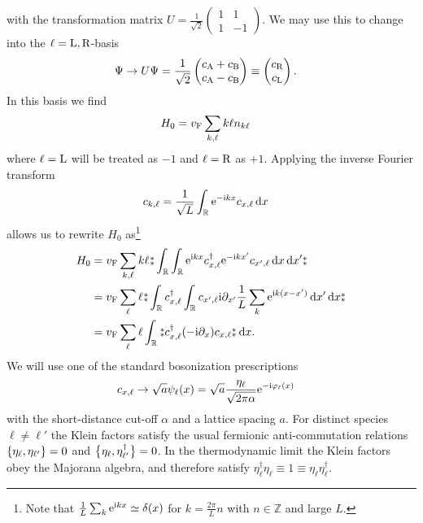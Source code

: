 \documentclass[english, parskip=full]{scrartcl}
\begin{document}
with the transformation matrix $U = \frac{1}{\sqrt{2}} \begin{pmatrix}
1 & 1 \\ 1 & -1
\end{pmatrix}$.
We may use this to change into the $\ell=\L,\R$-basis 
\begin{align}
\Psi &\rightarrow U\Psi = \frac{1}{\sqrt{2}} \begin{pmatrix}
c_\A + c_\B \\ c_\A - c_\B
\end{pmatrix} \equiv \begin{pmatrix}
c_\R \\ c_\L
\end{pmatrix}.
\end{align}
In this basis we find
\begin{align}
H_0 &= \vf\sum_{k,\ell} k\ell n_{k\ell}
\end{align}
where $\ell = \L$ will be treated as $-1$ and $\ell = \R$ as $+1$.
Applying the inverse Fourier transform
\begin{align}
c_{k,\ell} &= \frac{1}{\sqrt{L}} \intr{\powe{-\i kx} c_{x,\ell}}{x}
\end{align}
allows us to rewrite $H_0$ as\footnote{Note that $\frac{1}{L}\sum_k \powe{\i kx} \simeq \delta(x)$ for $k=\frac{2\pi}{L}n$ with $n\in\mathbb{Z}$ and large $L$.}
\begin{align}
H_0 &= \vf\sum_{k,\ell} k\ell \varnormord{\intr{\intr{\powe{\i kx} c_{x,\ell}^\dagger \powe{-\i kx'} c_{x',\ell}}{x}}{x'}} \\
&= \vf\sum_\ell \ell \varnormord{\intr{c_{x,\ell}^\dagger \intr{c_{x',\ell} \i \partial_{x'} \frac{1}{L} \sum_k \powe{\i k (x - x')} }{x'}}{x}} \\
&= \vf\sum_\ell \ell \intr{\varnormord{c_{x,\ell}^\dagger (-\i\partial_x) c_{x,\ell}}}{x}.
\end{align}
We will use one of the standard bosonization prescriptions
\begin{align}
c_{x,\ell} &\rightarrow \sqrt{a} \psi_\ell(x) = \sqrt{a} \frac{\eta_\ell}{\sqrt{2\pi \alpha}} \powe{-\i\varphi_\ell(x)} \label{eqn:bosonization_prescription}
\end{align}
with the short-distance cut-off $\alpha$ and a lattice spacing $a$.
For distinct species $\ell\neq\ell'$ the Klein factors satisfy the usual fermionic anti-commutation relations $\klc*{\eta_\ell, \eta_{\ell'}} = 0$ and $\klc[\big]{\eta_\ell, \eta_{\ell'}^\dagger} = 0$.
In the thermodynamic limit the Klein factors obey the Majorana algebra, and therefore satisfy $\eta_\ell^\dagger \eta_\ell \equiv 1 \equiv \eta_\ell\eta_\ell^\dagger$.
\end{document}
